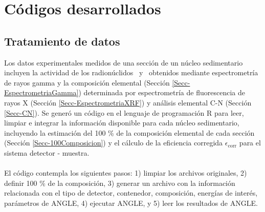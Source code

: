 \section[Códigos desarrollados]{Códigos desarrollados}\label{Secc-Codigos}
\subsection{Tratamiento de datos}
Los datos experimentales medidos de una sección de un núcleo sedimentario incluyen la actividad de los radionúclidos \PbCero\, y \PbCuatro\, obtenidos mediante espectrometría de rayos gamma y la composición elemental (Sección \ref{Secc-EspectrometriaGamma}) determinada por espectrometría de fluorescencia de rayos X (Sección \ref{Secc-EspectrometriaXRF}) y análisis elemental C-N (Sección \ref{Secc-CN}). Se generó un código en el lenguaje de programación R para leer, limpiar e integrar la información disponible para cada núcleo sedimentario, incluyendo la estimación del 100 \% de la composición elemental de cada sección (Sección \ref{Secc-100Composicion}) y el cálculo de la eficiencia corregida $\epsilon_\text{corr}$ para el sistema detector - muestra.
\\
\\
El código contempla los siguientes pasos: 1) limpiar los archivos originales, 2) definir 100 \% de la composición, 3) generar un archivo con la información relacionada con el tipo de detector, contenedor, composición, energías de interés, parámetros de ANGLE, 4) ejecutar ANGLE, y 5) leer los resultados de ANGLE.
